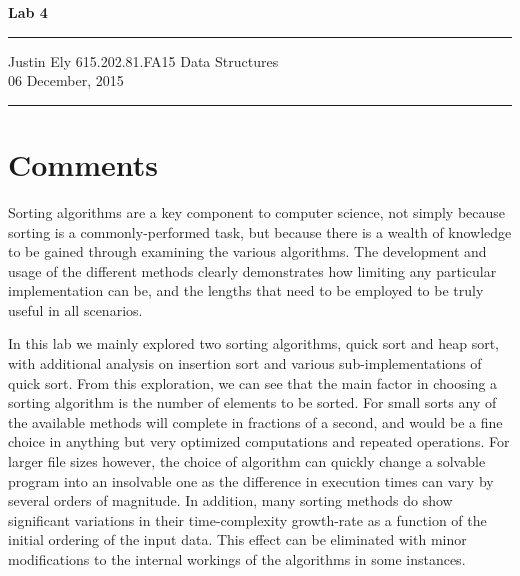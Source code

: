 \documentclass[a4paper,12pt]{article}
\begin{document}
\begin{flushright}

\vspace{1.1cm}

{\bf\Huge Lab 4}

\rule{0.25\linewidth}{0.5pt}

\vspace{0.5cm}
Justin Ely
\linebreak
\newline
\footnotesize{615.202.81.FA15 Data Structures \\}
\vspace{0.5cm}
06 December, 2015
\end{flushright}

\noindent\rule{\linewidth}{1.0pt}


\section{Comments}
Sorting algorithms are a key component to computer science, not simply because sorting is a commonly-performed task, but because there is a wealth of knowledge to be gained through examining the various algorithms.  The development and usage of the different methods clearly demonstrates how limiting any particular implementation can be, and the lengths that need to be employed to be truly useful in all scenarios.

In this lab we mainly explored two sorting algorithms, quick sort and heap sort, with additional analysis on insertion sort and various sub-implementations of quick sort.  From this exploration, we can see that the main factor in choosing a sorting algorithm is the number of elements to be sorted.  For small sorts any of the available methods will complete in fractions of a second, and would be a fine choice in anything but very optimized computations and repeated operations.  For larger file sizes however, the choice of algorithm can quickly change a solvable program into an insolvable one as the difference in execution times can vary by several orders of magnitude.  In addition, many sorting methods do show significant variations in their time-complexity growth-rate as a function of the initial ordering of the input data.  This effect can be eliminated with minor modifications to the internal workings of the algorithms in some instances.
\end{document}
